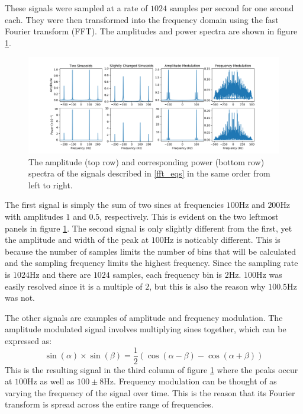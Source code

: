 \documentclass[twocolumn]{article}
\begin{document}
These signals were sampled at a rate of $1024$ samples per second for one second
each. They were then transformed into the frequency domain using the fast
Fourier transform (FFT). The amplitudes and power spectra are shown in figure \ref{fig:fft_exs}.

\begin{figure}
	\includegraphics[width=\linewidth]{fft_examples.png}
	\caption{
		The amplitude (top row) and corresponding power (bottom row) spectra of the
		signals described in \ref{fft_eqs} in the same order from left to right.
	}
	\label{fig:fft_exs}
\end{figure}

The first signal is simply the sum of two sines at frequencies $100$Hz and
$200$Hz with amplitudes $1$ and $0.5$, respectively. This is evident on the
two leftmost panels in figure \ref{fig:fft_exs}. The second signal is only
slightly different from the first, yet the amplitude and width of the peak at
$100$Hz is noticably different. This is because the number of samples limits the
number of bins that will be calculated and the sampling frequency limits the
highest frequency. Since the sampling rate is $1024$Hz and there are $1024$
samples, each frequency bin is $2$Hz. $100$Hz was easily resolved since it is a
multiple of $2$, but this is also the reason why $100.5$Hz was not.

The other signals are examples of amplitude and frequency modulation. The
amplitude modulated signal involves multiplying sines together, which can be
expressed as:
\begin{equation}
	\sin(\alpha) \times \sin(\beta) = \frac{1}{2} \left(
	\cos(\alpha - \beta) - \cos(\alpha + \beta)
	\right)
\end{equation}
This is the resulting signal in the third column of figure \ref{fig:fft_exs}
where the peaks occur at $100$Hz as well as $100 \pm 8$Hz. Frequency
modulation can be thought of as varying the frequency of the signal over time.
This is the reason that its Fourier transform is spread across the entire range
of frequencies.
\end{document}
